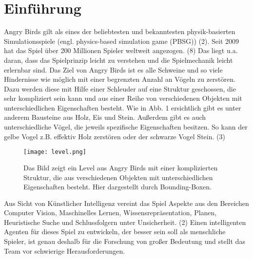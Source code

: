 \section{Einführung}
Angry Birds gilt als eines der beliebtesten und bekanntesten physik-basierten Simulationsspiele (engl. physics-based simulation game (PBSG)) (2). Seit 2009 hat das Spiel über 200 Millionen Spieler weltweit angezogen. (8) Das liegt u.a. daran, dass das Spielprinzip leicht zu verstehen und die Spielmechanik leicht erlernbar sind. Das Ziel von Angry Birds ist es alle Schweine und so viele Hindernisse wie möglich mit einer begrenzten Anzahl an Vögeln zu zerstören. Dazu werden diese mit Hilfe einer Schleuder auf eine Struktur geschossen, die sehr kompliziert sein kann und aus einer Reihe von verschiedenen Objekten mit unterschiedlichen Eigenschaften besteht. Wie in Abb. 1 ersichtlich gibt es unter anderem Bausteine aus Holz, Eis und Stein. Außerdem gibt es auch unterschiedliche Vögel, die jeweils spezifische Eigenschaften besitzen. So kann der gelbe Vogel z.B. effektiv Holz zerstören oder der schwarze Vogel Stein. (3)

\begin{figure} [h]
\begin{center}
\texttt{[image: level.png]}
\caption{Das Bild zeigt ein Level aus Angry Birds mit einer komplizierten Struktur, die aus verschiedenen Objekten mit unterschiedlichen Eigenschaften besteht. Hier dargestellt durch Bounding-Boxen.}
\end{center}
\end{figure}

Aus Sicht von Künstlicher Intelligenz vereint das Spiel Aspekte aus den Bereichen Computer Vision, Maschinelles Lernen, Wissensrepräsentation, Planen, Heuristische Suche und Schlussfolgern unter Unsicherheit. (2) Einen intelligenten Agenten für dieses Spiel zu entwickeln, der besser sein soll als menschliche Spieler, ist genau deshalb für die Forschung von großer Bedeutung und stellt das Team vor schwierige Herausforderungen.